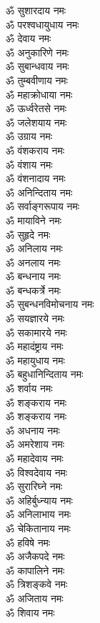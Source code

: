 \begin{multicols}{2}
\begin{flushleft}
ॐ सुशारदाय नमः\\
ॐ परश्वधायुधाय नमः\\
ॐ देवाय नमः\\
ॐ अनुकारिणे नमः\\
ॐ सुबान्धवाय नमः\\
ॐ तुम्बवीणाय नमः\\
ॐ महाक्रोधाया नमः\\
ॐ ऊर्ध्वरेतसे नमः\\
ॐ जलेशयाय नमः\\
ॐ उग्राय नमः\hfill{}\\
ॐ वंशकराय नमः\\
ॐ वंशाय नमः\\
ॐ वंशनादाय नमः\\
ॐ अनिन्दिताय नमः\\
ॐ सर्वाङ्गरूपाय नमः\\
ॐ मायाविने नमः\\
ॐ सुहृदे नमः\\
ॐ अनिलाय नमः\\
ॐ अनलाय नमः\\
ॐ बन्धनाय नमः\hfill{}\\
ॐ बन्धकर्त्रे नमः\\
ॐ सुबन्धनविमोचनाय नमः\\
ॐ सयज्ञारये नमः\\
ॐ सकामारये नमः\\
ॐ महादंष्ट्राय नमः\\
ॐ महायुधाय नमः\\
ॐ बहुधानिन्दिताय नमः\\
ॐ शर्वाय नमः\\
ॐ शङ्कराय नमः\\
ॐ शङ्कराय नमः\hfill{}\\
ॐ अधनाय नमः\\
ॐ अमरेशाय नमः\\
ॐ महादेवाय नमः\\
ॐ विश्वदेवाय नमः\\
ॐ सुरारिघ्ने नमः\\
ॐ अहिर्बुध्न्याय नमः\\
ॐ अनिलाभाय नमः\\
ॐ चेकितानाय नमः\\
ॐ हविषे नमः\\
ॐ अजैकपदे नमः\hfill{}\\
ॐ कापालिने नमः\\
ॐ त्रिशङ्कवे नमः\\
ॐ अजिताय नमः\\
ॐ शिवाय नमः\\

\end{flushleft}
\end{multicols}
